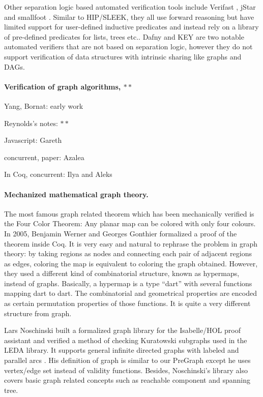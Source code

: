 Other separation logic based automated verification tools include Verifast \cite{jacobs:verifast}, jStar \cite{DistefanoP08} and smallfoot \cite{berdine:smallfoot}. Similar to HIP/SLEEK, they all use forward reasoning but have limited support for user-defined inductive predicates and instead rely on a library of pre-defined predicates for lists, trees etc.. Dafny \cite{Leino10} and KEY \cite{Beckert:2007} are two notable automated verifiers that are not based on separation logic, however they do not support verification of data structures with intrinsic sharing like graphs and DAGs.

\paragraph{Verification of graph algorithms, $**$}

Yang, Bornat: early work

Reynolds's notes: $**$

Javascript: Gareth

concurrent, paper: Azalea

In Coq, concurrent: Ilya and Aleks

\paragraph{Mechanized mathematical graph theory.}

The most famous graph related theorem which has been mechanically
verified is the Four Color Theorem: Any planar map can be colored with
only four colours. In 2005, Benjamin Werner and Georges Gonthier
formalized a proof of the theorem \cite{gonthier2005computer} inside
Coq. It is very easy and natural to rephrase the problem in graph
theory: by taking regions as nodes and connecting each pair of
adjacent regions as edges, coloring the map is equivalent to coloring
the graph obtained. However, they used a different kind of
combinatorial structure, known as hypermaps, instead of
graphs. Basically, a hypermap is a type ``dart'' with several
functions mapping dart to dart. The combinatorial and geometrical
properties are encoded as certain permutation properties of those
functions. It is quite a very different structure from graph.

Lars Noschinski built a formalized graph library for the Isabelle/HOL
proof assistant and verified a method of checking Kuratowski subgraphs
used in the LEDA library. It supports general infinite directed graphs
with labeled and parallel arcs \cite{Noschinski2015}. His definition
of graph is similar to our PreGraph except he uses vertex/edge set
instead of validity functions. Besides, Noschinski's library also
covers basic graph related concepts such as reachable component and
spanning tree.

